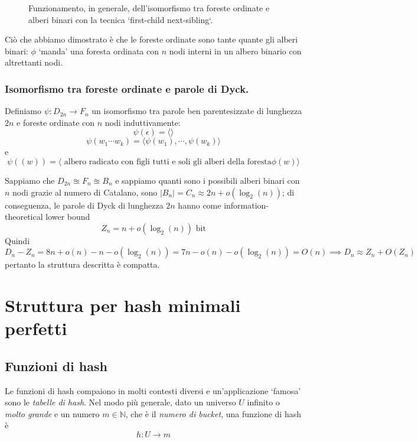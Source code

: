 \begin{figure}[h]
	\caption{Funzionamento, in generale, dell'isomorfismo tra foreste ordinate e alberi binari con
		la tecnica `first-child next-sibling`.}
	\label{fig:iso_forest_bintree}
\end{figure}

Ciò che abbiamo dimostrato è che le foreste ordinate sono tante quante gli alberi binari:
$\phi$ `manda' una foresta ordinata con $n$ nodi interni in un albero binario con altrettanti nodi.

\subsubsection{Isomorfismo tra foreste ordinate e parole di Dyck.}
Definiamo $\psi: D_{2n} \rightarrow F_n$ un isomorfismo tra parole ben parentesizzate di lunghezza $2n$ e
foreste ordinate con $n$ nodi induttivamente:
$$
	\psi(\epsilon) = \langle \rangle
$$
$$
	\psi(w_1 \cdots w_k) =  \langle\psi(w_1), \cdots, \psi(w_k)\rangle
$$
e
$$
	\psi((w)) = \langle \text{ albero radicato con figli tutti e soli gli alberi della foresta} \phi(w)  \rangle
$$

\noindent
Sappiamo che $D_{2n} \approxeq F_n \approxeq B_n$ e sappiamo quanti sono i possibili alberi binari
con $n$ nodi grazie al numero di Catalano, sono $|B_n| = C_n  \approx 2n + o (\log_2(n))$; di conseguenza,
le parole di Dyck di lunghezza $2n$ hanno come information-theoretical lower bound
$$
	Z_n = n + o(\log_2(n)) \text{ bit}
$$
Quindi
$$
	D_n - Z_n =  8n + o(n) - n - o(\log_2(n)) = 7n - o(n) - o(\log_2(n))  = O(n) \implies D_n \approx Z_n + O(Z_n)
$$
pertanto la struttura descritta è compatta.

\section{Struttura per hash minimali perfetti}
\subsection{Funzioni di hash}
Le funzioni di hash compaiono in molti contesti diversi e un'applicazione
`famosa' sono le \textit{tabelle di hash}.
Nel modo più generale, dato un universo $U$ infinito o \textit{molto grande} e un numero $m \in \mathbb{N}$,
che è il \textit{numero di bucket}, una funzione di hash è
$$
	h: U \rightarrow m
$$

